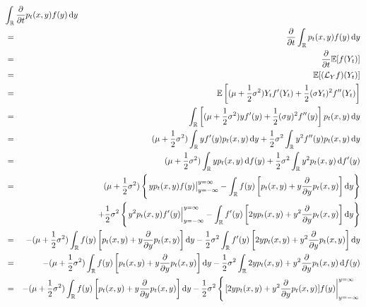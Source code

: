\begin{enumerate}
        \begin{eqnarray*}
            \lefteqn{\int_\mbb{R} \frac{\partial}{\partial t} p_t(x,y) f(y) \dif y} \\ 
            & = & \frac{\partial}{\partial t} \int_\mbb{R} p_t(x,y) f(y) \dif y \\ 
            & = & \frac{\partial}{\partial t} \E [f(Y_t)] \\ 
            & = & \E [(\mathcal{L}_Y f)(Y_t)] \\ 
            & = & \E \left[(\mu + \frac{1}{2} \sigma^2)Y_t f'(Y_t) + \frac{1}{2} (\sigma Y_t)^2 f''(Y_t)\right] \\ 
            & = & \int_\mbb{R} \left[ (\mu+\frac{1}{2}\sigma^2) y f'(y) + \frac{1}{2} (\sigma y)^2 f''(y) \right] p_t(x,y) \dif y \\ 
            & = & (\mu + \frac{1}{2} \sigma^2) \int_\mbb{R} y f'(y) p_t(x, y) \dif y + \frac{1}{2}\sigma^2 \int_\mbb{R} y^2 f''(y) p_t(x, y) \dif y \\ 
            & = &(\mu + \frac{1}{2} \sigma^2) \int_\mbb{R} y p_t(x,y) \dif f(y) + \frac{1}{2} \sigma^2 \int_\mbb{R} y^2 p_t(x,y) \dif f'(y) \\ 
            & = & (\mu + \frac{1}{2}\sigma^2) \left\{ \left. yp_t(x,y)f(y) \right|_{y = -\infty}^{y = \infty} - \int_\mbb{R} f(y) \left[p_t(x,y)+ y \frac{\partial}{\partial y} p_t(x, y)\right] \dif y\right\} \\ 
            & & + \frac{1}{2}\sigma^2 \left\{ \left. y^2p_t(x,y)f'(y) \right|_{y = -\infty}^{y = \infty} - \int_\mbb{R} f'(y) \left[ 2y p_t(x,y) + y^2 \frac{\partial}{\partial y} p_t(x,y) \right] \dif y\right\} \\ 
            & = & - (\mu + \frac{1}{2}\sigma^2)  \int_\mbb{R} f(y) \left[p_t(x,y)+ y \frac{\partial}{\partial y} p_t(x, y)\right] \dif y - \frac{1}{2} \sigma^2 \int_\mbb{R} f'(y) \left[ 2y p_t(x,y) + y^2 \frac{\partial}{\partial y} p_t(x,y) \right] \dif y \\ 
            & = & - (\mu + \frac{1}{2}\sigma^2)  \int_\mbb{R} f(y) \left[p_t(x,y)+ y \frac{\partial}{\partial y} p_t(x, y)\right] \dif y -  \frac{1}{2} \sigma^2 \int_\mbb{R} 2y p_t(x,y) + y^2 \frac{\partial}{\partial y} p_t(x,y) \dif f(y) \\ 
            & = & - (\mu + \frac{1}{2}\sigma^2)  \int_\mbb{R} f(y) \left[p_t(x,y)+ y \frac{\partial}{\partial y} p_t(x, y)\right] \dif y - \frac{1}{2} \sigma^2 \left\{ \left. [2y p_t(x,y) + y^2 \frac{\partial}{\partial y} p_t(x,y)] f(y) \right|_{y = -\infty}^{y = \infty} \right. \\ 

\end{eqnarray*}
\end{enumerate}
